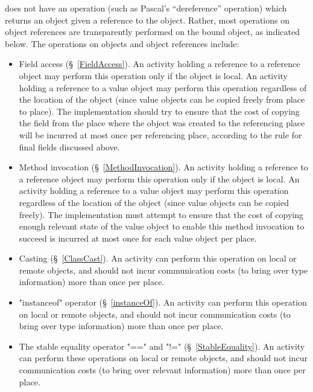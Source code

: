 {}\Xten{} does not have an operation (such as Pascal's ``dereference''
operation) which returns an object given a reference to the
object. Rather, most operations on object references are transparently
performed on the bound object, as indicated below. The operations on
objects and object references include:
\begin{itemize}

{}\item Field access (\S~\ref{FieldAccess}). An activity holding a
reference to a reference object may perform this operation only if the
object is local.  An activity holding a reference to a value object
may perform this operation regardless of the location of the object
(since value objects can be copied freely from place to place).  The
implementation should try to ensure that the cost of copying the field
from the place where the object was created to the referencing place
will be incurred at most once per referencing place, according to the
rule for final fields discussed above.

\item Method invocation (\S~\ref{MethodInvocation}).  An activity
holding a reference to a reference object may perform this operation
only if the object is local.  An activity holding a reference to a
value object may perform this operation regardless of the location of
the object (since value objects can be copied freely). The \Xten{}
implementation must attempt to ensure that the cost of copying enough
relevant state of the value object to enable this method invocation to
succeed is incurred at most once for each value object per place.

{}\item Casting (\S~\ref{ClassCast}).  An activity can perform this
operation on local or remote objects, and should not incur
communication costs (to bring over type information) more than once
per place.

{}\item \xcd"instanceof" operator (\S~\ref{instanceOf}).  An activity
can perform this operation on local or remote objects, and should not
incur communication costs (to bring over type information) more than
once per place.

\item The stable equality operator \xcd"==" and \xcd"!="
(\S~\ref{StableEquality}). An activity can perform these operations on
local or remote objects, and should not incur communication costs
(to bring over relevant information) more than once per place.

\end{itemize}


